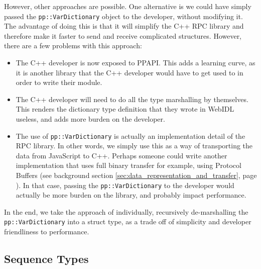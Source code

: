 However, other approaches are possible. One alternative is we could have simply passed the \lstinline{pp::VarDictionary} object to the developer, without modifying it. The advantage of doing this is that it will simplify the C++ RPC library and therefore make it faster to send and receive complicated structures. However, there are a few problems with this approach:

\begin{itemize}
	\item The C++ developer is now exposed to PPAPI. This adds a learning curve, as it is another library that the C++ developer would have to get used to in order to write their module.
	\item The C++ developer will need to do all the type marshalling by themselves. This renders the dictionary type definition that they wrote in WebIDL useless, and adds more burden on the developer.
	\item The use of \lstinline{pp::VarDictionary} is actually an implementation detail of the RPC library. In other words, we simply use this as a way of transporting the data from JavaScript to C++. Perhaps someone could write another implementation that uses full binary transfer for example, using Protocol Buffers (see background section \ref{sec:data_representation_and_transfer}, page \pageref{sec:data_representation_and_transfer}). In that case, passing the \lstinline{pp::VarDictionary} to the developer would actually be more burden on the library, and probably impact performance.
\end{itemize}

In the end, we take the approach of individually, recursively de-marshalling the \lstinline{pp::VarDictionary} into a struct type, as a trade off of simplicity and developer friendliness to performance.

\subsection{Sequence Types} %
\label{sub:sequence_types}


